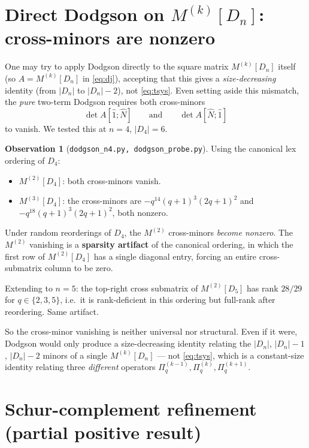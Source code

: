 \documentclass[11pt]{article}
\theoremstyle{definition}
\newtheorem{observation}[theorem]{Observation}
\begin{document}
\section{Direct Dodgson on \texorpdfstring{$M^{(k)}[D_n]$}{M(k)}: cross-minors are nonzero}\label{sec:direct}

One may try to apply Dodgson directly to the square matrix $M^{(k)}[D_n]$ itself (so $A = M^{(k)}[D_n]$ in \eqref{eq:dj}), accepting that this gives a \emph{size-decreasing} identity (from $|D_n|$ to $|D_n|-2$), not \eqref{eq:tsys}. Even setting aside this mismatch, the \emph{pure} two-term Dodgson requires both cross-minors
\[
\det A[\hat 1; \hat N]\qquad \text{and}\qquad \det A[\hat N; \hat 1]
\]
to vanish. We tested this at $n=4$, $|D_4| = 6$.

\begin{observation}[\texttt{dodgson\_n4.py, dodgson\_probe.py}]\label{obs:cross}
Using the canonical lex ordering of $D_4$:
\begin{itemize}
  \item $M^{(2)}[D_4]$: both cross-minors vanish.
  \item $M^{(3)}[D_4]$: the cross-minors are $-q^{14}(q+1)^3(2q+1)^2$ and $-q^{18}(q+1)^3(2q+1)^2$, both nonzero.
\end{itemize}
Under random reorderings of $D_4$, the $M^{(2)}$ cross-minors \emph{become nonzero}. The $M^{(2)}$ vanishing is a \textbf{sparsity artifact} of the canonical ordering, in which the first row of $M^{(2)}[D_4]$ has a single diagonal entry, forcing an entire cross-submatrix column to be zero.

Extending to $n=5$: the top-right cross submatrix of $M^{(2)}[D_5]$ has rank $28/29$ for $q \in \{2,3,5\}$, i.e.\ it is rank-deficient in this ordering but full-rank after reordering. Same artifact.
\end{observation}

So the cross-minor vanishing is neither universal nor structural. Even if it were, Dodgson would only produce a size-decreasing identity relating the $|D_n|$, $|D_n|-1$, $|D_n|-2$ minors of a single $M^{(k)}[D_n]$ --- not \eqref{eq:tsys}, which is a constant-size identity relating three \emph{different} operators $\Pi_q^{(k-1)}, \Pi_q^{(k)}, \Pi_q^{(k+1)}$.

\section{Schur-complement refinement (partial positive result)}\label{sec:schur}
\end{document}
